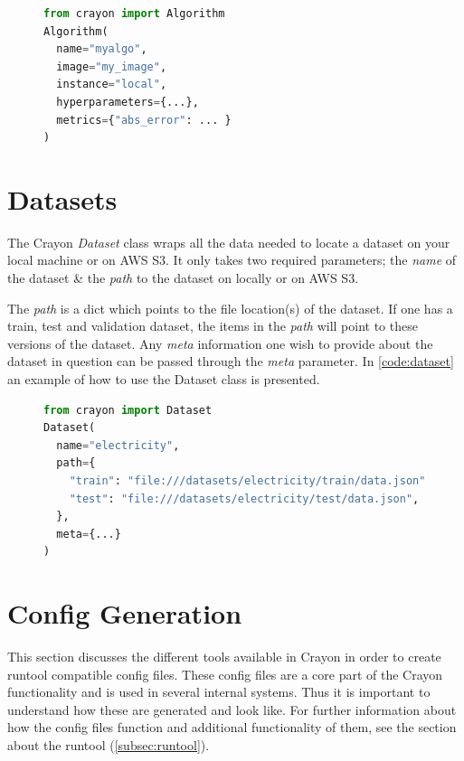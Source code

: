 \begin{figure}[h]
  \begin{lstlisting}[language=Python,label={code:algorithm},caption={Example of the Algorithm class.}]
from crayon import Algorithm
Algorithm(
  name="myalgo", 
  image="my_image", 
  instance="local",
  hyperparameters={...},
  metrics={"abs_error": ... }
)
  \end{lstlisting}

\end{figure}
\section{Datasets}
\label{crayon:datasets}
The Crayon \textit{Dataset} class wraps all the data needed to locate a dataset on your local machine or on AWS S3. It only takes two required parameters; the \textit{name} of the dataset \& the \textit{path} to the dataset on locally or on AWS S3.

The \textit{path} is a dict which points to the file location(s) of the dataset. If one has a train, test and validation dataset, the items in the \textit{path} will point to these versions of the dataset. Any \textit{meta} information one wish to provide about the dataset in question can be passed through the \textit{meta} parameter. In \ref{code:dataset} an example of how to use the Dataset class is presented.
\begin{figure}[h]
  \begin{lstlisting}[language=Python, label={code:dataset}, caption={Example of the Dataset class.}]
from crayon import Dataset
Dataset(
  name="electricity",
  path={
    "train": "file:///datasets/electricity/train/data.json",
    "test": "file:///datasets/electricity/test/data.json",
  },
  meta={...}
)
  \end{lstlisting}
\end{figure}
\section{Config Generation}
\label{'subsub:config_generation'}
This section discusses the different tools available in Crayon in order to create runtool compatible config files. These config files are a core part of the Crayon functionality and is used in several internal systems. Thus it is important to understand how these are generated and look like. For further information about how the config files function and additional functionality of them, see the section about the runtool (\ref{subsec:runtool}).

